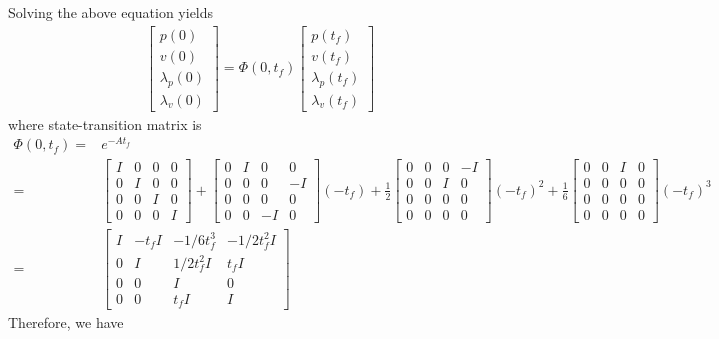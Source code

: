 \documentclass[letterpaper, 10 pt, conference,onecolumn]{ieeeconf}  %
\begin{document}
Solving the above equation yields
\begin{align*}
\begin{bmatrix}
p(0)\\
v(0)\\
\lambda_{p}(0)\\
\lambda_v(0)
\end{bmatrix}=\Phi(0,t_f)\begin{bmatrix}
p(t_f)\\
v(t_f)\\
\lambda_{p}(t_f)\\
\lambda_v(t_f)
\end{bmatrix}
\end{align*}
where state-transition matrix is 
\begin{align*}
\Phi(0,t_f)=&e^{-At_f}\\
=&\begin{bmatrix}
I&0&0&0\\
0&I&0&0\\
0&0&I&0\\
0&0&0&I
\end{bmatrix}+\begin{bmatrix}
0&I&0&0\\
0&0&0&-I\\
0&0&0&0\\
0&0&-I&0
\end{bmatrix}(-t_f)+\frac{1}{2}\begin{bmatrix}
0&0&0&-I\\
0&0&I&0\\
0&0&0&0\\
0&0&0&0
\end{bmatrix}(-t_f)^2+\frac{1}{6}\begin{bmatrix}
0&0&I&0\\
0&0&0&0\\
0&0&0&0\\
0&0&0&0
\end{bmatrix}(-t_f)^3\\
=&\begin{bmatrix}
I&-t_f I&-1/6t_f^3&-1/2t_f^2I\\
0&I&1/2t_f^2I&t_f I\\
0&0&I&0\\
0&0&t_f I&I
\end{bmatrix}
\end{align*}
Therefore, we have
\end{document}
